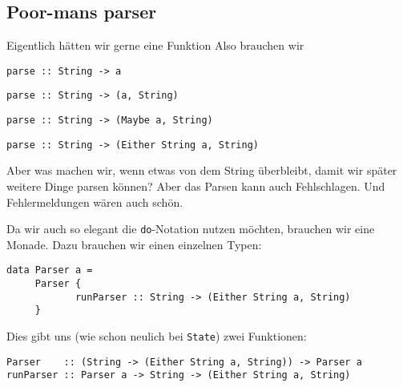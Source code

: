 \documentclass{beamer}
\begin{document}
\subsection{Poor-mans parser}
\begin{frame}[fragile]
\begin{overprint}
Eigentlich hätten wir gerne eine Funktion
Also brauchen wir
\end{overprint}
\begin{overprint}
\begin{verbatim}
parse :: String -> a
\end{verbatim}
\begin{verbatim}
parse :: String -> (a, String)
\end{verbatim}
\begin{verbatim}
parse :: String -> (Maybe a, String)
\end{verbatim}
\begin{verbatim}
parse :: String -> (Either String a, String)
\end{verbatim}
\end{overprint}
\begin{overprint}
Aber was machen wir, wenn etwas von dem String überbleibt, damit wir später weitere Dinge parsen können?
Aber das Parsen kann auch Fehlschlagen.
Und Fehlermeldungen wären auch schön.
\end{overprint}
\pause
\pause
\pause
\pause
\pause
\pause
Da wir auch so elegant die \texttt{do}-Notation nutzen möchten, brauchen wir eine Monade. Dazu brauchen wir einen einzelnen Typen:\\
\pause
\begin{verbatim}
data Parser a = 
     Parser {
            runParser :: String -> (Either String a, String)
     }
\end{verbatim}
\pause
Dies gibt uns (wie schon neulich bei \texttt{State}) zwei Funktionen:
\begin{verbatim}
Parser    :: (String -> (Either String a, String)) -> Parser a
runParser :: Parser a -> String -> (Either String a, String)
\end{verbatim}
\end{frame}
\end{document}
